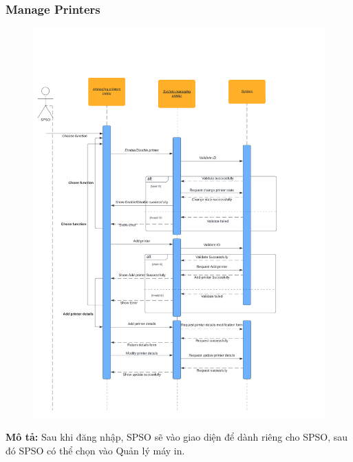     \subsubsection{Manage Printers}
    \begin{center}
    \begin{figure}[!htp]
    \begin{center}
     \includegraphics[scale=.6]{images/Task2/SequenceDiagrams/ManagePrinter.pdf}
    \end{center}
    \label{refhinh1}
    \end{figure}
    \end{center}

    \textbf{Mô tả:}
    Sau khi đăng nhập, SPSO sẽ vào giao diện để dành riêng cho SPSO, sau đó SPSO có thể chọn vào Quản lý máy in. \\

